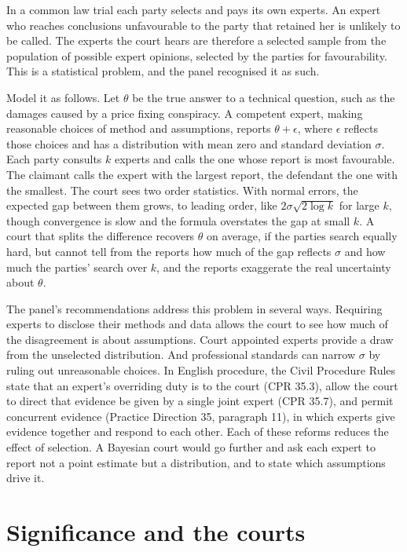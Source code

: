In a common law trial each party selects and pays its own experts. An expert who reaches conclusions unfavourable to the party that retained her is unlikely to be called. The experts the court hears are therefore a selected sample from the population of possible expert opinions, selected by the parties for favourability. This is a statistical problem, and the panel recognised it as such.

Model it as follows. Let $\theta$ be the true answer to a technical question, such as the damages caused by a price fixing conspiracy. A competent expert, making reasonable choices of method and assumptions, reports $\theta + \epsilon$, where $\epsilon$ reflects those choices and has a distribution with mean zero and standard deviation $\sigma$. Each party consults $k$ experts and calls the one whose report is most favourable. The claimant calls the expert with the largest report, the defendant the one with the smallest. The court sees two order statistics. With normal errors, the expected gap between them grows, to leading order, like $2\sigma\sqrt{2\log k}$ for large $k$, though convergence is slow and the formula overstates the gap at small $k$. A court that splits the difference recovers $\theta$ on average, if the parties search equally hard, but cannot tell from the reports how much of the gap reflects $\sigma$ and how much the parties' search over $k$, and the reports exaggerate the real uncertainty about $\theta$.

The panel's recommendations address this problem in several ways. Requiring experts to disclose their methods and data allows the court to see how much of the disagreement is about assumptions. Court appointed experts provide a draw from the unselected distribution. And professional standards can narrow $\sigma$ by ruling out unreasonable choices. In English procedure, the Civil Procedure Rules state that an expert's overriding duty is to the court (CPR 35.3), allow the court to direct that evidence be given by a single joint expert (CPR 35.7), and permit concurrent evidence (Practice Direction 35, paragraph 11), in which experts give evidence together and respond to each other. Each of these reforms reduces the effect of selection. A Bayesian court would go further and ask each expert to report not a point estimate but a distribution, and to state which assumptions drive it.

\section{Significance and the courts}

